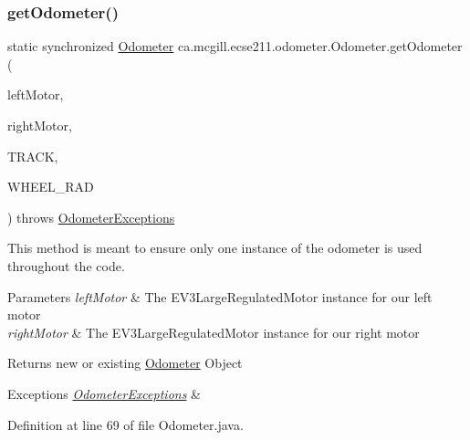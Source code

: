 \subsubsection{\texorpdfstring{get\+Odometer()}{getOdometer()}\hspace{0.1cm}{\footnotesize\ttfamily [1/2]}}
{\footnotesize\ttfamily static synchronized \hyperlink{classca_1_1mcgill_1_1ecse211_1_1odometer_1_1_odometer}{Odometer} ca.\+mcgill.\+ecse211.\+odometer.\+Odometer.\+get\+Odometer (\begin{DoxyParamCaption}\item[{E\+V3\+Large\+Regulated\+Motor}]{left\+Motor,  }\item[{E\+V3\+Large\+Regulated\+Motor}]{right\+Motor,  }\item[{final double}]{T\+R\+A\+CK,  }\item[{final double}]{W\+H\+E\+E\+L\+\_\+\+R\+AD }\end{DoxyParamCaption}) throws \hyperlink{classca_1_1mcgill_1_1ecse211_1_1odometer_1_1_odometer_exceptions}{Odometer\+Exceptions}\hspace{0.3cm}{\ttfamily [static]}}

This method is meant to ensure only one instance of the odometer is used throughout the code.


\begin{DoxyParams}{Parameters}
{\em left\+Motor} & The E\+V3\+Large\+Regulated\+Motor instance for our left motor \\
\hline
{\em right\+Motor} & The E\+V3\+Large\+Regulated\+Motor instance for our right motor \\
\hline
\end{DoxyParams}
\begin{DoxyReturn}{Returns}
new or existing \hyperlink{classca_1_1mcgill_1_1ecse211_1_1odometer_1_1_odometer}{Odometer} Object 
\end{DoxyReturn}

\begin{DoxyExceptions}{Exceptions}
{\em \hyperlink{classca_1_1mcgill_1_1ecse211_1_1odometer_1_1_odometer_exceptions}{Odometer\+Exceptions}} & \\
\hline
\end{DoxyExceptions}


Definition at line 69 of file Odometer.\+java.


